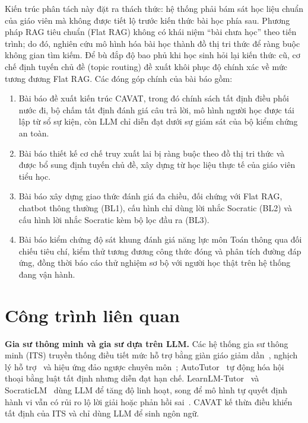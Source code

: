 \documentclass[10pt,a4paper,twocolumn]{article}
\begin{document}
Kiến trúc phân tách này đặt ra thách thức: hệ thống phải bám sát học liệu chuẩn của giáo viên mà không được tiết lộ trước kiến thức bài học phía sau. Phương pháp RAG tiêu chuẩn (Flat RAG) không có khái niệm ``bài chưa học'' theo tiến trình; do đó, nghiên cứu mô hình hóa bài học thành đồ thị tri thức để ràng buộc không gian tìm kiếm. Để bù đắp độ bao phủ khi học sinh hỏi lại kiến thức cũ, cơ chế định tuyến chủ đề (topic routing) đề xuất khôi phục độ chính xác về mức tương đương Flat RAG. Các đóng góp chính của bài báo gồm:
\begin{enumerate}
  \item Bài báo đề xuất kiến trúc CAVAT, trong đó chính sách tất định điều phối nước đi, bộ chấm tất định đánh giá câu trả lời, mô hình người học được tái lập từ sổ sự kiện, còn LLM chỉ diễn đạt dưới sự giám sát của bộ kiểm chứng an toàn.
  \item Bài báo thiết kế cơ chế truy xuất lai bị ràng buộc theo đồ thị tri thức và được bổ sung định tuyến chủ đề, xây dựng từ học liệu thực tế của giáo viên tiểu học.
  \item Bài báo xây dựng giao thức đánh giá đa chiều, đối chứng với Flat RAG, chatbot thông thường (BL1), cấu hình chỉ dùng lời nhắc Socratic (BL2) và cấu hình lời nhắc Socratic kèm bộ lọc đầu ra (BL3).
  \item Bài báo kiểm chứng độ sát khung đánh giá năng lực môn Toán thông qua đối chiếu tiêu chí, kiểm thử tương đương công thức đóng và phân tích đường đáp ứng, đồng thời báo cáo thử nghiệm sơ bộ với người học thật trên hệ thống đang vận hành.
\end{enumerate}

\section{Công trình liên quan}\label{sec:related}

\textbf{Gia sư thông minh và gia sư dựa trên LLM.} Các hệ thống gia sư thông minh (ITS) truyền thống điều tiết mức hỗ trợ bằng giàn giáo giảm dần~\cite{wood1976}, nghịch lý hỗ trợ~\cite{koedinger2007,aleven2016} và hiệu ứng đảo ngược chuyên môn~\cite{kalyuga2003}; AutoTutor~\cite{graesser2005} tự động hóa hội thoại bằng luật tất định nhưng diễn đạt hạn chế. LearnLM-Tutor~\cite{jurenka2024} và SocraticLM~\cite{liu2024socratic} dùng LLM để tăng độ linh hoạt, song để mô hình tự quyết định hành vi vẫn có rủi ro lộ lời giải hoặc phản hồi sai~\cite{macina2023,tack2022}. CAVAT kế thừa điều khiển tất định của ITS và chỉ dùng LLM để sinh ngôn ngữ.
\end{document}
